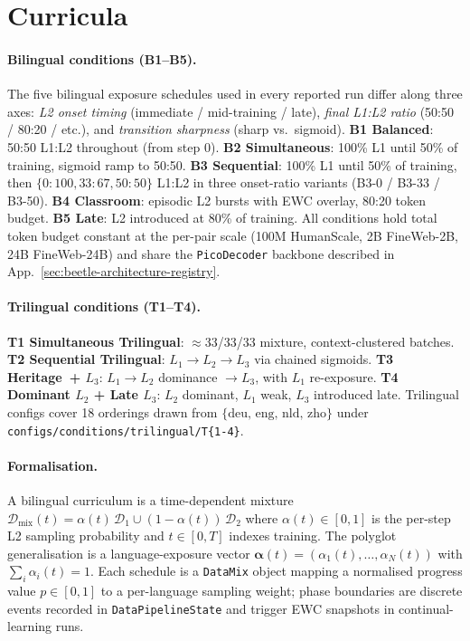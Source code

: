 \section{\beetle{} Curricula}\label{sec:beetle-curricula}

\paragraph{Bilingual conditions (B1--B5).} The five bilingual exposure schedules used in every reported run differ along three axes: \emph{L2 onset timing} (immediate / mid-training / late), \emph{final L1:L2 ratio} (50:50 / 80:20 / etc.), and \emph{transition sharpness} (sharp vs.\ sigmoid). \textbf{B1 Balanced}: 50:50 L1:L2 throughout (from step 0). \textbf{B2 Simultaneous}: 100\% L1 until 50\% of training, sigmoid ramp to 50:50. \textbf{B3 Sequential}: 100\% L1 until 50\% of training, then $\{0:100, 33:67, 50:50\}$ L1:L2 in three onset-ratio variants (B3-0 / B3-33 / B3-50). \textbf{B4 Classroom}: episodic L2 bursts with EWC overlay, 80:20 token budget. \textbf{B5 Late}: L2 introduced at 80\% of training. All conditions hold total token budget constant at the per-pair scale (100M HumanScale, 2B FineWeb-2B, 24B FineWeb-24B) and share the \texttt{PicoDecoder} backbone described in App.~\ref{sec:beetle-architecture-registry}.

\paragraph{Trilingual conditions (T1--T4).} \textbf{T1 Simultaneous Trilingual}: $\approx$33/33/33 mixture, context-clustered batches. \textbf{T2 Sequential Trilingual}: $L_1\to L_2\to L_3$ via chained sigmoids. \textbf{T3 Heritage~+ $L_3$}: $L_1\to L_2$ dominance $\to L_3$, with $L_1$ re-exposure. \textbf{T4 Dominant $L_2$ + Late $L_3$}: $L_2$ dominant, $L_1$ weak, $L_3$ introduced late. Trilingual configs cover 18 orderings drawn from $\{\text{deu, eng, nld, zho}\}$ under \texttt{configs/conditions/trilingual/T\{1-4\}}.

\paragraph{Formalisation.} A bilingual curriculum is a time-dependent mixture $\mathcal{D}_{\text{mix}}(t) = \alpha(t)\,\mathcal{D}_1 \cup (1-\alpha(t))\,\mathcal{D}_2$ where $\alpha(t)\in[0,1]$ is the per-step L2 sampling probability and $t\in[0,T]$ indexes training. The polyglot generalisation is a language-exposure vector $\boldsymbol{\alpha}(t)=(\alpha_1(t),\ldots,\alpha_N(t))$ with $\sum_i \alpha_i(t)=1$. Each schedule is a \texttt{DataMix} object mapping a normalised progress value $p\in[0,1]$ to a per-language sampling weight; phase boundaries are discrete events recorded in \texttt{DataPipelineState} and trigger EWC snapshots in continual-learning runs.

